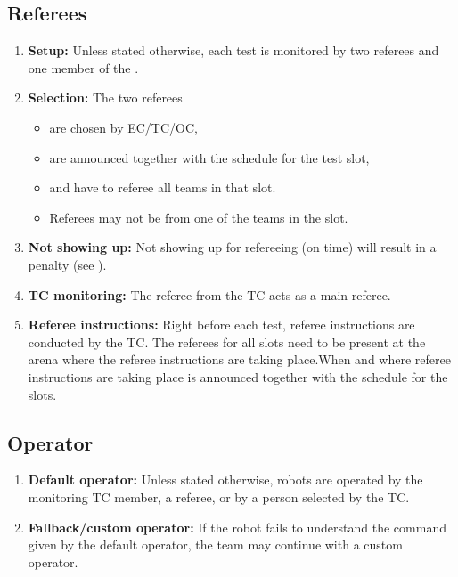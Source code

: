 \subsection{Referees}
\label{rule:referees}
\begin{enumerate}
	\item \textbf{Setup:} Unless stated otherwise, each test is monitored by two referees and one member of the .
	\item \textbf{Selection:} The two referees 
	\begin{itemize}
		\item are chosen by EC/TC/OC, 
		\item are announced together with the schedule for the test slot, 
		\item and have to referee all teams in that slot.
		\item Referees may not be from one of the teams in the slot.
	\end{itemize}
	\item \textbf{Not showing up:} Not showing up for refereeing (on time) will result in a penalty (see ). 
	\item \textbf{TC monitoring:} The referee from the TC acts as a main referee. 
	\item \textbf{Referee instructions:} Right before each test, referee instructions are conducted by the TC. The referees for all slots need to be present at the arena where the referee instructions are taking place.When and where referee instructions are taking place is announced together with the schedule for the slots.
\end{enumerate}


\subsection{Operator}
\label{rule:operator}
\begin{enumerate}
	\item \textbf{Default operator:} Unless stated otherwise, robots are operated by the monitoring TC member, a referee, or by a person selected by the TC.
	\item \textbf{Fallback/custom operator:} If the robot fails to understand the command given by the default operator, the team may continue with a custom operator.
\end{enumerate}



